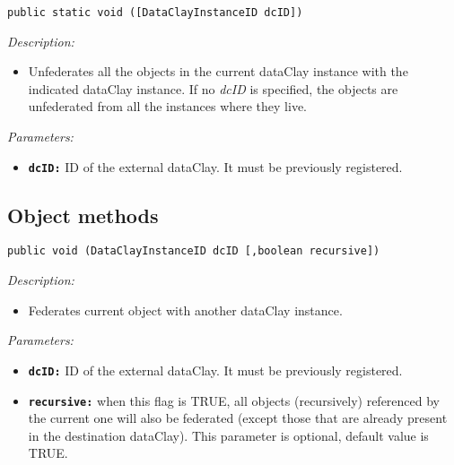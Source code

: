 \begin{dBox}

\texttt{public static void ([DataClayInstanceID dcID])}
\LINE

{\it Description:}

\begin{itemize}
  \item Unfederates all the objects in the current dataClay instance with the indicated dataClay instance. If no \textit{dcID} is specified, the objects are unfederated from all the instances where they live.
\end{itemize}

{\it Parameters:}

\begin{itemize}
  \item \texttt{\bfseries dcID:} ID of the external dataClay. It must be previously registered.
\end{itemize}

\end{dBox}

\subsection{Object methods}
\label{sec:JavaFederationObject}

\begin{dBox}
\texttt{public void (DataClayInstanceID dcID [,boolean recursive])}
\LINE

{\it Description:}

\begin{itemize}
  \item Federates current object with another dataClay instance. 
\end{itemize}

{\it Parameters:}

\begin{itemize}
  \item \texttt{\bfseries dcID:} ID of the external dataClay. It must be previously registered.
  \item \texttt{\bfseries recursive:} when this flag is TRUE, all objects (recursively) referenced by the current one will also be federated (except those that are already present in the destination dataClay). This parameter is optional, default value is TRUE.
\end{itemize}

\end{dBox}

